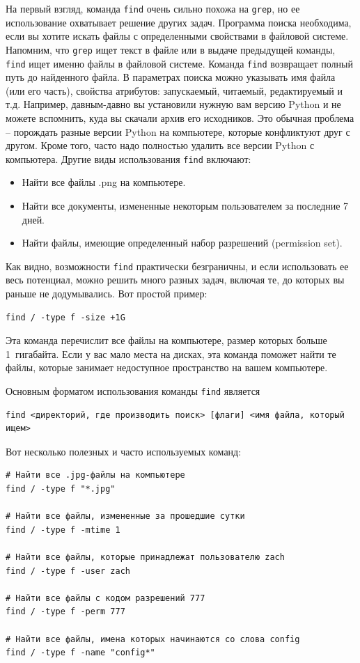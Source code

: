 \documentclass[a4paper,12pt,final,openany]{extbook}
\providecommand{\tightlist}{%
  \setlength{\itemsep}{0pt}\setlength{\parskip}{0pt}}
\begin{document}
На первый взгляд, команда \texttt{find} очень сильно похожа на \texttt{grep}, но ее
использование охватывает решение других задач. Программа поиска
необходима, если вы хотите искать файлы с определенными свойствами в
файловой системе. Напомним, что \texttt{grep} ищет текст в файле или в
выдаче предыдущей команды, \texttt{find} ищет именно файлы в файловой
системе. Команда \texttt{find} возвращает полный путь до найденного файла.
В параметрах поиска можно указывать
имя файла (или его часть), свойства атрибутов: запускаемый, читаемый, редактируемый и т.д.
Например, давным-давно вы установили нужную вам версию Python и не
можете вспомнить, куда вы скачали архив его исходников. Это обычная
проблема -- порождать разные версии Python на компьютере, которые конфликтуют
друг с другом. Кроме того, часто надо полностью удалить все версии
Python с компьютера. Другие виды использования \texttt{find} включают:
\begin{itemize}
\tightlist
\item
  Найти все файлы .png на компьютере.
\item
  Найти все документы, измененные некоторым пользователем за последние 7
  дней.
\item
  Найти файлы, имеющие определенный набор разрешений (permission set).
\end{itemize}

Как видно, возможности \texttt{find} практически безграничны, и если
использовать ее весь потенциал, можно решить много разных задач, включая
те, до которых вы раньше не додумывались. Вот простой пример:
\begin{verbatim}
find / -type f -size +1G
\end{verbatim}
Эта команда перечислит все файлы на компьютере, размер которых больше 1~гигабайта.
Если у вас мало места на дисках, эта команда поможет найти те
файлы, которые занимает недоступное пространство на вашем компьютере.

Основным форматом использования команды \texttt{find} является
\begin{verbatim}
find <директорий, где производить поиск> [флаги] <имя файла, который ищем>
\end{verbatim}

Вот несколько полезных и часто используемых команд:
\begin{verbatim}
# Найти все .jpg-файлы на компьютере
find / -type f "*.jpg"

# Найти все файлы, измененные за прошедшие сутки
find / -type f -mtime 1

# Найти все файлы, которые принадлежат пользователю zach
find / -type f -user zach

# Найти все файлы с кодом разрешений 777
find / -type f -perm 777

# Найти все файлы, имена которых начинаются со слова config
find / -type f -name "config*"
\end{verbatim}
\end{document}
